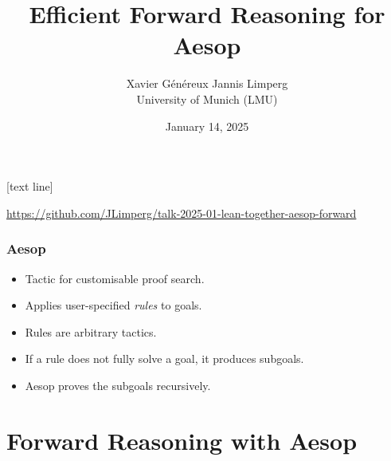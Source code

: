 \title{Efficient Forward Reasoning for Aesop}
\author{Xavier Généreux \qquad Jannis Limperg\\ University of Munich (LMU)}
\date{January 14, 2025}

[text line]{\parbox{\textwidth}{\centering \url{https://github.com/JLimperg/talk-2025-01-lean-together-aesop-forward}\medskip}}

\begin{frame}
  \maketitle
\end{frame}



\begin{frame}
  \frametitle{Aesop}

  \begin{itemize}
    \item Tactic for customisable proof search.
    \item Applies user-specified \emph{rules} to goals.
    \item Rules are arbitrary tactics.
    \item If a rule does not fully solve a goal, it produces subgoals.
    \item Aesop proves the subgoals recursively.
  \end{itemize}
\end{frame}

\begin{frame}
  \tableofcontents
\end{frame}

\section{Forward Reasoning with Aesop}

